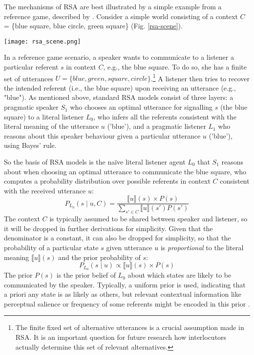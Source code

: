 The mechanisms of RSA are best illustrated by a simple example from a reference game, described by \textcite{frank2012predicting}.
Consider a simple world consisting of a context $C$ = \{blue square, blue circle, green square\} (Fig. \ref{rsa-scene}).
\begin{figure*}[t]
	\begin{center}
		\texttt{[image: rsa\_scene.png]}
	\end{center}
	\vspace{-0.3cm}
	\caption{A simple reference resolution example scenario: the context $C$ consists of three possible referents \parencite{frank2012predicting}}
	\label{rsa-scene}
\end{figure*}
In a reference game scenario, a speaker wants to communicate to a listener a particular referent $s$ in context $C$, e.g., the blue square. To do so, she has a finite set of utterances $U = \{blue, green, square, circle\}$.\footnote{The finite fixed set of alternative utterances is a crucial assumption made in RSA. It is an important question for future research how interlocutors actually determine this set of relevant alternatives.} A listener then tries to recover the intended referent (i.e., the blue square) upon receiving an utterance (e.g., "blue"). 
As mentioned above, standard RSA models consist of three layers: a pragmatic speaker $S_1$ who chooses an optimal utterance for signalling $s$ (the blue square) to a literal listener $L_0$, who infers all the referents consistent with the literal meaning of the utterance $u$ ('blue'), and a pragmatic listener $L_1$ who reasons about this speaker behaviour given a particular utterance $u$ ('blue'), using Bayes' rule.

So the basis of RSA models is the na\"ive literal listener agent $L_0$ that $S_1$ reasons about when choosing an optimal utterance to communicate the blue square, who computes a probability distribution over possible referents in context $C$  consistent with the received utterance $u$: %
\begin{equation}
P_{L_0}(s \mid u, C) = \frac{\llbracket u \rrbracket (s) \times P(s)}{\sum_{s' \in C} \llbracket u \rrbracket (s') P(s')}
\end{equation}
The context $C$ is typically assumed to be shared between speaker and listener, so it will be dropped in further derivations for simplicity. Given that the denominator is a constant, it can also be dropped for simplicity, so that the probability of a particular state $s$ given utterance $u$ is \emph{proportional} to the literal meaning $\llbracket u \rrbracket (s)$ and the prior probability of $s$: 
\begin{equation}
P_{L_0}(s \mid u) \propto \llbracket u \rrbracket (s) \times P(s)
\end{equation}
The prior $P(s)$ is the prior belief of $L_0$ about which states are likely to be communicated by the speaker. Typically, a uniform prior is used, indicating that a priori any state is as likely as others, but relevant contextual information like perceptual salience or frequency of some referents might be encoded in this prior \parencite{frank2012predicting}.

